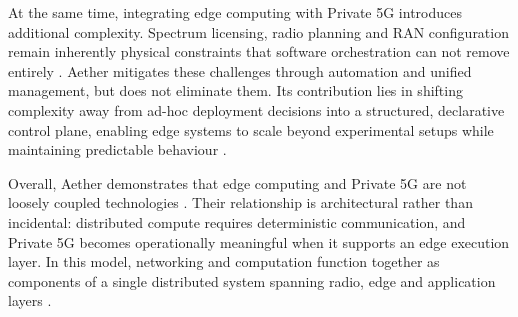At the same time, integrating edge computing with Private 5G introduces additional complexity. Spectrum licensing, radio planning and RAN configuration remain inherently physical constraints that software orchestration can not remove entirely \cite{private_5g_report}. Aether mitigates these challenges through automation and unified management, but does not eliminate them. Its contribution lies in shifting complexity away from ad-hoc deployment decisions into a structured, declarative control plane, enabling edge systems to scale beyond experimental setups while maintaining predictable behaviour \cite{onf_aether_whitepaper}.

Overall, Aether demonstrates that edge computing and Private 5G are not loosely coupled technologies \cite{onf_aether_technical_whitepaper}. Their relationship is architectural rather than incidental: distributed compute requires deterministic communication, and Private 5G becomes operationally meaningful when it supports an edge execution layer. In this model, networking and computation function together as components of a single distributed system spanning radio, edge and application layers \cite{onf_aether_whitepaper}. \cite{openai_llm_drafting}
